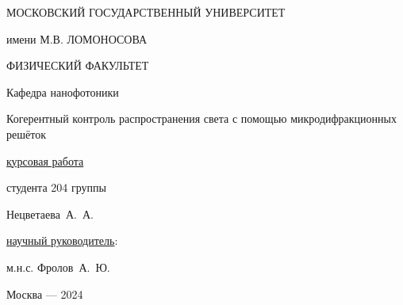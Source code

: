 \begin{titlepage}
    {\Large \center
        МОСКОВСКИЙ ГОСУДАРСТВЕННЫЙ УНИВЕРСИТЕТ

        имени М.В. ЛОМОНОСОВА

        ФИЗИЧЕСКИЙ ФАКУЛЬТЕТ

        Кафедра нанофотоники

    }
    \begin{centering}
        \vspace{4cm}
        \Large
        \centering
        Когерентный контроль распространения света с помощью микродифракционных решёток\\
    \end{centering}
    \vspace{4cm}
    \begin{flushright}
        \underline{курсовая работа}

        студента 204 группы

        Нецветаева~А.~А. \vspace{1.5cm}

        \underline{научный руководитель}:

        м.н.с. Фролов~А.~Ю.

    \end{flushright}
    \vspace{4cm}
    \begin{centering}
        Москва --- 2024

    \end{centering}
\end{titlepage}

